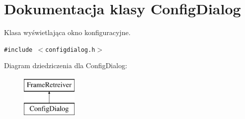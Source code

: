 \hypertarget{class_config_dialog}{
\section{Dokumentacja klasy ConfigDialog}
\label{class_config_dialog}
}
Klasa wyświetlająca okno konfiguracyjne.  


{\tt \#include $<$configdialog.h$>$}

Diagram dziedziczenia dla ConfigDialog:\begin{figure}[H]
\begin{center}
\leavevmode
\includegraphics[height=2cm]{class_config_dialog}
\end{center}
\end{figure}
